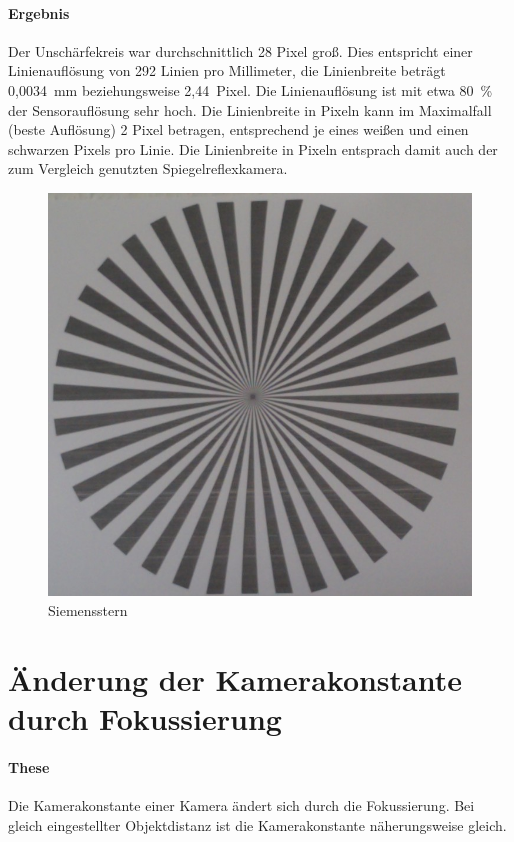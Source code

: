 \documentclass[./00PhotoBox.tex]{subfiles}
\begin{document}
\paragraph{Ergebnis}

Der Unschärfekreis war durchschnittlich 28 Pixel groß. Dies entspricht einer Linienauflösung von 292 Linien pro Millimeter, die Linienbreite beträgt 0,0034~mm beziehungsweise 2,44~Pixel. Die Linienauflösung ist mit etwa 80~\% der Sensorauflösung sehr hoch. Die Linienbreite in Pixeln kann im Maximalfall (beste Auflösung) 2 Pixel betragen, entsprechend je eines weißen und einen schwarzen Pixels pro Linie. Die Linienbreite in Pixeln entsprach damit auch der zum Vergleich genutzten Spiegelreflexkamera.

\begin{figure}
    \centering
    \includegraphics[width=1\textwidth]{./img/siemens.jpg}
    \caption{Siemensstern} %
    \label{img:siemens} %
\end{figure}


\section{Änderung der Kamerakonstante durch Fokussierung}
\label{sec:fokus}

\paragraph{These}
Die Kamerakonstante einer Kamera ändert sich durch die Fokussierung. Bei gleich eingestellter Objektdistanz ist die Kamerakonstante näherungsweise gleich.
\end{document}
